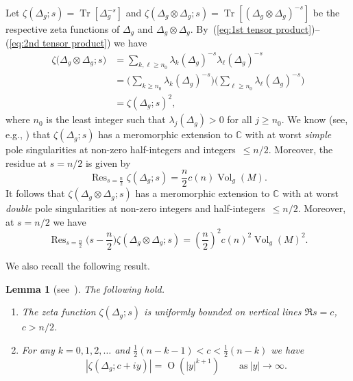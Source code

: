 \documentclass[10pt, a4paper]{amsart}
\newcommand{\C}{\mathbb{C}}
\newcommand{\op}{\operatorname}
\newcommand{\Vol}{\op{Vol}}
\newcommand{\Tr}{\op{Tr}}
\newcommand{\Res}{\op{Res}}
\numberwithin{equation}{section}
\newtheorem{lemma}[theorem]{Lemma}
\theoremstyle{definition}
\theoremstyle{remark}
\begin{document}
Let $\zeta(\Delta_g;s)=\Tr[\Delta_g^{-s}]$ and $\zeta(\Delta_g\otimes \Delta_g;s)=\Tr[(\Delta_g\otimes \Delta_g)^{-s}]$ be the respective zeta functions of
$\Delta_g$ and $\Delta_g\otimes \Delta_g$. By~(\ref{eq:1st tensor product})--(\ref{eq:2nd tensor product}) we have
\begin{align*}
 \zeta\big(\Delta_g\otimes \Delta_g;s\big) &= \sum_{k,\ell\geq n_0} \lambda_k(\Delta_g)^{-s}\lambda_\ell(\Delta_g)^{-s}\\
  &=  \bigg(\sum_{k\geq n_0} \lambda_k(\Delta_g)^{-s}\bigg) \bigg(\sum_{\ell\geq n_0} \lambda_\ell(\Delta_g)^{-s}\bigg) \\
  &=\zeta(\Delta_g;s)^2,
\end{align*}
where $n_0$ is the least integer such that $\lambda_j(\Delta_g)>0$ for all $j\geq n_0$.
We know (see, e.g., \cite{Sh:Springer01}) that $\zeta(\Delta_g;s)$ has a meromorphic extension to $\C$ with at worst \emph{simple} pole singularities at non-zero half-integers and integers~$\leq n/2$. Moreover, the residue at $s=n/2$ is given by
\begin{equation}\label{eq:Intro.Residue-Deltag}
 \Res_{s=\frac{n}{2}} \zeta(\Delta_g;s)= \frac{n}{2}c(n) \Vol_g(M). 
\end{equation}
It follows that $\zeta(\Delta_g\otimes \Delta_g;s)$  has a meromorphic extension to $\C$ with at worst \emph{double} pole singularities at non-zero integers and half-integers~$\leq n/2$. Moreover, at $s=n/2$ we have
\begin{equation*}
  \Res_{s=\frac{n}{2}} \big(s-\frac{n}{2}\big)\zeta(\Delta_g\otimes\Delta_g;s)= \left(\frac{n}{2}\right)^2c(n)^2 \Vol_g(M)^2. 
\end{equation*}

We also recall the following result. 

\begin{lemma}[see~{\cite[Corollary~2.2]{DG:IM75}}]\label{lem:Example.DG}
The following hold.
\begin{enumerate}
 \item The zeta function $\zeta(\Delta_g;s)$ is uniformly bounded on vertical lines $\Re s=c$, $c>n/2$. 
 
 \item For any $k=0,1,2,\ldots$ and $\frac12(n-k-1)<c<\frac12(n-k)$ we have
\begin{equation*}
\left| \zeta(\Delta_g;c+iy)\right| =\op{O}\left(|y|^{k+1}\right) \qquad \text{as}\ |y|\rightarrow \infty. 
\end{equation*}
\end{enumerate}
 \end{lemma}
\end{document}
